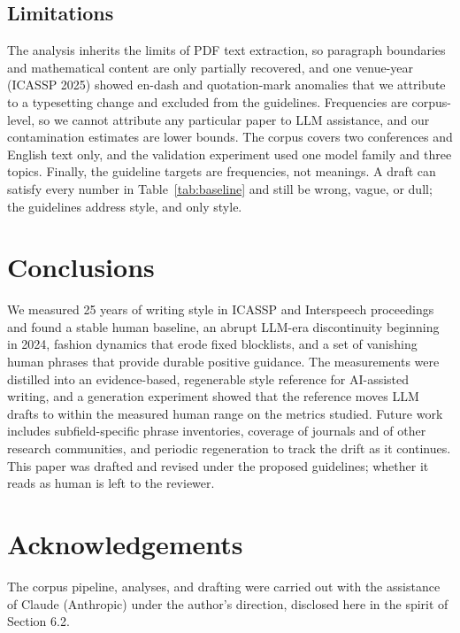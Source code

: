 \documentclass[a4paper,10pt,twocolumn]{article}
\begin{document}
\subsection{Limitations}

The analysis inherits the limits of PDF text extraction, so paragraph boundaries and mathematical content are only partially recovered, and one venue-year (ICASSP 2025) showed en-dash and quotation-mark anomalies that we attribute to a typesetting change and excluded from the guidelines. Frequencies are corpus-level, so we cannot attribute any particular paper to LLM assistance, and our contamination estimates are lower bounds. The corpus covers two conferences and English text only, and the validation experiment used one model family and three topics. Finally, the guideline targets are frequencies, not meanings. A draft can satisfy every number in Table~\ref{tab:baseline} and still be wrong, vague, or dull; the guidelines address style, and only style.

\section{Conclusions}

We measured 25 years of writing style in ICASSP and Interspeech proceedings and found a stable human baseline, an abrupt LLM-era discontinuity beginning in 2024, fashion dynamics that erode fixed blocklists, and a set of vanishing human phrases that provide durable positive guidance. The measurements were distilled into an evidence-based, regenerable style reference for AI-assisted writing, and a generation experiment showed that the reference moves LLM drafts to within the measured human range on the metrics studied. Future work includes subfield-specific phrase inventories, coverage of journals and of other research communities, and periodic regeneration to track the drift as it continues. This paper was drafted and revised under the proposed guidelines; whether it reads as human is left to the reviewer.

\enlargethispage{2\baselineskip}
\section{Acknowledgements}

The corpus pipeline, analyses, and drafting were carried out with the assistance of Claude (Anthropic) under the author's direction, disclosed here in the spirit of Section 6.2.
\end{document}
